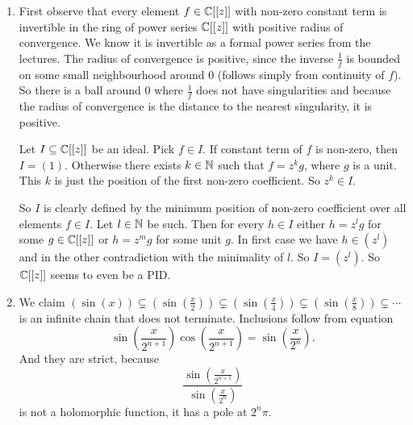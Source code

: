 \begin{exercise}{2}
    \begin{enumerate}
        \item First observe that every element $f \in \mathbb{C}[[z]]$ with non-zero
            constant term is invertible in the ring of power series $\mathbb{C}[[z]]$
            with positive radius of convergence. We know it is invertible as a
            formal power series from the lectures. The radius of convergence is
            positive, since the inverse $\frac{1}{f}$ is bounded on some small
            neighbourhood around $0$ (follows simply from continuity of $f$). So
            there is a ball around $0$ where $\frac{1}{f}$ does not have
            singularities and because the radius of convergence is the distance
            to the nearest singularity, it is positive.

            Let $I \subseteq \mathbb{C}[[z]]$ be an ideal. Pick $f \in I$. If constant
            term of $f$ is non-zero, then $I = (1)$. Otherwise there exists $k
            \in \mathbb{N}$ such that $f = z^k g$, where $g$ is a unit. This $k$ is just
            the position of the first non-zero coefficient. So $z^k \in I$.

            So $I$ is clearly defined by the minimum position of non-zero
            coefficient over all elements $f \in I$. Let $l \in \mathbb{N}$ be such.
            Then for every $h \in I$ either $h = z^l g$ for some $g \in \mathbb{C}[[z]]$
            or $h = z^m g$ for some unit $g$. In first case we have $h \in
            (z^l)$ and in the other contradiction with the minimality of $l$. So
            $I = (z^l)$. So $\mathbb{C}[[z]]$ seems to even be a PID.
        \item We claim $(\sin(x)) \subsetneq (\sin(\frac{x}{2})) \subsetneq
            (\sin(\frac{x}{4})) \subsetneq (\sin(\frac{x}{8})) \subsetneq
            \cdots$ is an infinite chain that does not terminate. Inclusions
            follow from equation
            \begin{equation*}
                \sin(\frac{x}{2^{n+1}}) \cos(\frac{x}{2^{n+1}}) = \sin(\frac{x}{2^n}).
            \end{equation*}
            And they are strict, because
            \begin{equation*}
                \frac{\sin(\frac{x}{2^{n+1}})}{\sin(\frac{x}{2^n})}
            \end{equation*}
            is not a holomorphic function, it has a pole at $2^n \pi$.
    \end{enumerate}
\end{exercise}


